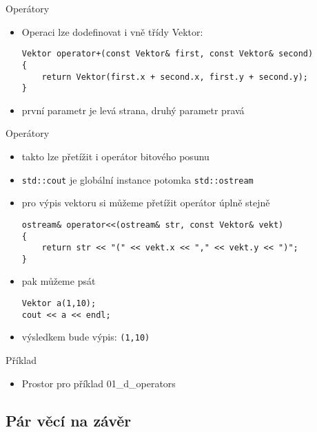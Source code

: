 \documentclass{beamer}
\begin{document}
\begin{xframe}{Operátory}
	\begin{itemize}
		\item Operaci lze dodefinovat i vně třídy Vektor:
\begin{lstlisting}[basicstyle=\fontsize{8}{9}\selectfont\ttfamily]
Vektor operator+(const Vektor& first, const Vektor& second)
{
    return Vektor(first.x + second.x, first.y + second.y);
}
\end{lstlisting}
		\item první parametr je levá strana, druhý parametr pravá
	\end{itemize}
\end{xframe}



\begin{xframe}{Operátory}
	\begin{itemize}
		\item takto lze přetížit i operátor bitového posunu
		\item \texttt{std::cout} je globální instance potomka \texttt{std::ostream}
		\item pro výpis vektoru si můžeme přetížit operátor úplně stejně
\begin{lstlisting}[basicstyle=\fontsize{8}{9}\selectfont\ttfamily]
ostream& operator<<(ostream& str, const Vektor& vekt)
{
    return str << "(" << vekt.x << "," << vekt.y << ")";
}
\end{lstlisting}
		\item pak můžeme psát
\begin{lstlisting}[basicstyle=\fontsize{8}{9}\selectfont\ttfamily]
Vektor a(1,10);
cout << a << endl;
\end{lstlisting}
		\item výsledkem bude výpis: \texttt{(1,10)}
	\end{itemize}
\end{xframe}


\begin{xframe}{Příklad}
	\begin{itemize}
		\item Prostor pro příklad 01\_d\_operators
	\end{itemize}
\end{xframe}

\subsection{Pár věcí na závěr}
\end{document}
